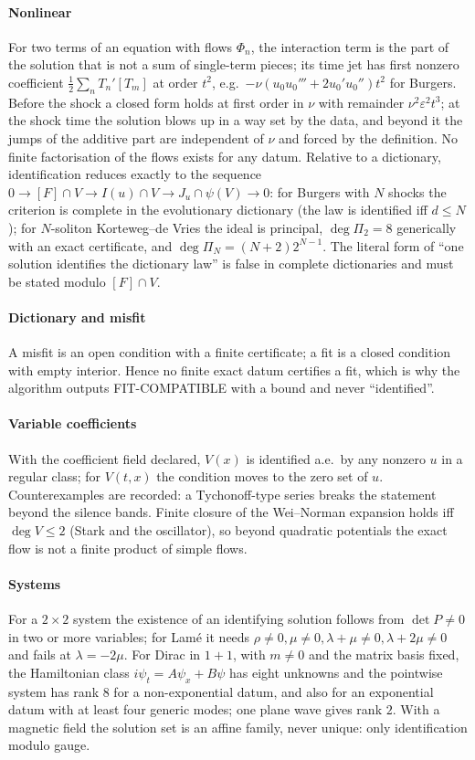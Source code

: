 \documentclass[11pt]{article}
\theoremstyle{plain}
\theoremstyle{definition}
\theoremstyle{remark}
\newcommand{\lab}[1]{\textsf{#1}}           %
\newcommand{\FC}{\lab{FIT-COMPATIBLE}}
\begin{document}
\paragraph{Nonlinear} For two terms of an equation with flows $\Phi_n$, the interaction term is the part of the solution that is not a sum of single-term pieces; its time jet has first
nonzero coefficient $\tfrac12\sum_n T_n'[T_m]$ at order $t^2$, e.g.\ $-\nu(u_0u_0'''+2u_0'u_0'')t^2$ for Burgers. Before the shock a closed form holds at first order in $\nu$ with remainder $\nu^2\varepsilon^2t^3$; at the shock
time the solution blows up in a way set by the data, and beyond it the jumps of the additive part are independent of $\nu$ and forced by the definition. No finite factorisation of the flows exists for any datum. Relative to a dictionary, identification
reduces exactly to the sequence $0\to[F]\cap V\to I(u)\cap V\to J_u\cap\psi(V)\to0$: for Burgers with $N$ shocks the criterion is complete in the evolutionary dictionary (the law is identified iff $d\le N$); for $N$-soliton Korteweg--de Vries
the ideal is principal, $\deg\Pi_2=8$ generically with an exact certificate, and $\deg\Pi_N=(N+2)2^{N-1}$. The literal form of ``one solution identifies the dictionary law'' is false in complete dictionaries and must be stated modulo $[F]\cap V$.

\paragraph{Dictionary and misfit} A misfit is an open condition with a finite certificate; a fit is a closed condition with empty interior. Hence no finite exact datum certifies a fit, which is why the algorithm outputs \FC{} with a bound and never ``identified''.

\paragraph{Variable coefficients} With the coefficient field declared, $V(x)$ is identified a.e.\ by any nonzero $u$ in a regular class; for $V(t,x)$ the condition moves to the zero set of $u$.
Counterexamples are recorded: a Tychonoff-type series breaks the statement beyond the silence bands. Finite closure of the Wei--Norman expansion holds iff $\deg V\le2$ (Stark and the oscillator), so beyond quadratic potentials the exact flow is not a finite product of simple flows.

\paragraph{Systems} For a $2\times2$ system the existence of an identifying solution follows from $\det P\neq0$ in two or more variables; for Lam\'e it needs $\rho\neq0,\mu\neq0,\lambda+\mu\neq0,\lambda+2\mu\neq0$ and fails at $\lambda=-2\mu$. For Dirac in $1+1$, with $m\neq0$ and the matrix basis fixed, the Hamiltonian class
$i\psi_t=A\psi_x+B\psi$ has eight unknowns and the pointwise system has rank $8$ for a non-exponential datum, and also for an exponential datum with at least four generic modes; one plane wave gives rank $2$.
With a magnetic field the solution set is an affine family, never unique: only identification modulo gauge.
\end{document}
